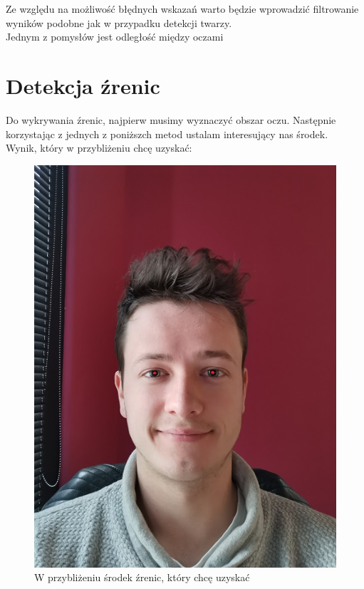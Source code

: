 \documentclass[10pt, a4paper]{article}
\begin{document}
Ze względu na możliwość błędnych wskazań warto będzie wprowadzić filtrowanie wyników podobne jak w przypadku detekcji twarzy.\\
Jednym z pomysłów jest odległość między oczami 

\section{Detekcja źrenic}

Do wykrywania źrenic, najpierw musimy wyznaczyć obszar oczu. Następnie korzystając z jednych z poniższch metod ustalam interesujący nas środek. \\
Wynik, który w przybliżeniu chcę uzyskać:

\begin{figure}[H]
    \begin{center}
        \includegraphics[scale=0.35]{images/expected_pupils.jpg}
        \caption{W przybliżeniu środek źrenic, który chcę uzyskać}
        \label{fig:expected_pupils}
    \end{center}
\end{figure}
\end{document}
